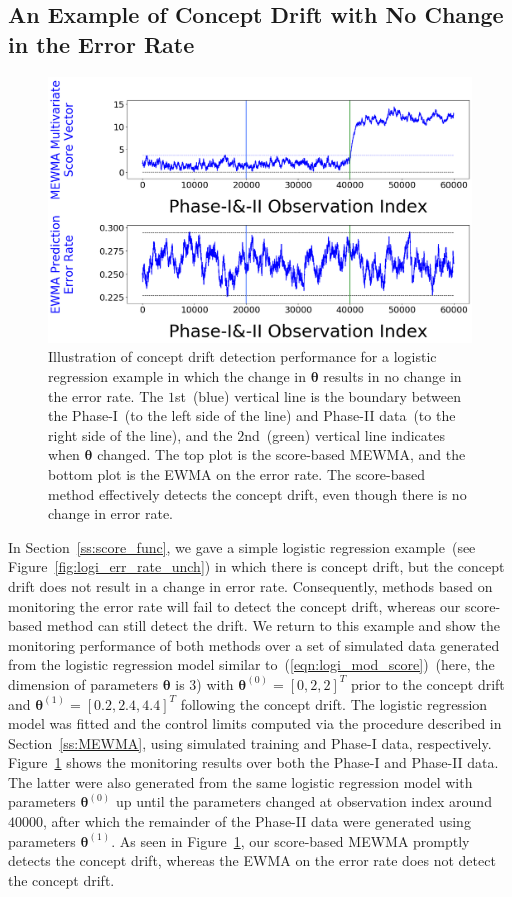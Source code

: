 \documentclass[twoside,11pt]{article}
\begin{document}
\subsection{An Example of Concept Drift with No Change in the Error Rate}
\label{ss:cd_no_err_change}
\begin{figure}[!htp]
\centering
\includegraphics[width = .8\linewidth]{../figures/v14/sim_11/non_nnet_nonunif_ch_f_0_2/1_sim11_logi_1e-08_0_0015_1.png}
  \caption{Illustration of concept drift detection performance for a logistic regression example in which the change in $\bm{\theta}$ results in no change in the error rate. The $1$st~(blue) vertical line is the boundary between the Phase-I~(to the left side of the line) and Phase-II data~(to the right side of the line), and the $2$nd~(green) vertical line indicates when $\bm{\theta}$ changed. The top plot is the score-based MEWMA, and the bottom plot is the EWMA on the error rate. The score-based method effectively detects the concept drift, even though there is no change in error rate.}
  \label{fig:exp_no_err_ch}
\end{figure}
In Section~\ref{ss:score_func}, we gave a simple logistic regression example~(see Figure~\ref{fig:logi_err_rate_unch}) in which there is concept drift, but the concept drift does not result in a change in error rate. Consequently, methods based on monitoring the error rate will fail to detect the concept drift, whereas our score-based method can still detect the drift. We return to this example and show the monitoring performance of both methods over a set of simulated data generated from the logistic regression model similar to~(\ref{eqn:logi_mod_score})~(here, the dimension of parameters $\bm{\theta}$ is $3$) with $\bm{\theta}^{(0)} = [0,2,2]^T$ prior to the concept drift and $\bm{\theta}^{(1)} = [0.2,2.4,4.4]^T$ following the concept drift. The logistic regression model was fitted and the control limits computed via the procedure described in Section~\ref{ss:MEWMA}, using simulated training and Phase-I data, respectively. Figure~\ref{fig:exp_no_err_ch} shows the monitoring results over both the Phase-I and Phase-II data. The latter were also generated from the same logistic regression model with parameters $\bm{\theta}^{(0)}$ up until the parameters changed at observation index around $40000$, after which the remainder of the Phase-II data were generated using parameters $\bm{\theta}^{(1)}$. As seen in Figure~\ref{fig:exp_no_err_ch}, our score-based MEWMA promptly detects the concept drift, whereas the EWMA on the error rate does not detect the concept drift. 
\end{document}
